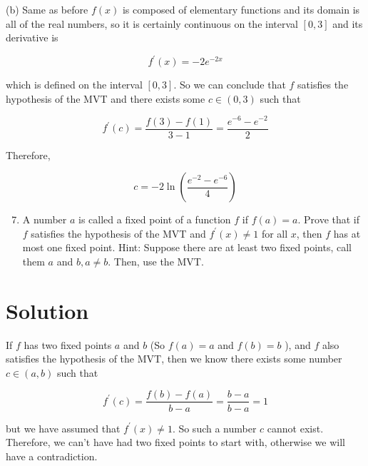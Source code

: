 \documentclass[10pt]{article}
\begin{document}
(b) Same as before $f(x)$ is composed of elementary functions and its domain is all of the real numbers, so it is certainly continuous on the interval $[0,3]$ and its derivative is

$$
f^{\prime}(x)=-2 e^{-2 x}
$$

which is defined on the interval $[0,3]$. So we can conclude that $f$ satisfies the hypothesis of the MVT and there exists some $c \in(0,3)$ such that

$$
f^{\prime}(c)=\frac{f(3)-f(1)}{3-1}=\frac{e^{-6}-e^{-2}}{2}
$$

Therefore,

$$
c=-2 \ln \left(\frac{e^{-2}-e^{-6}}{4}\right)
$$

\begin{enumerate}
  \setcounter{enumi}{6}
  \item A number $a$ is called a fixed point of a function $f$ if $f(a)=a$. Prove that if $f$ satisfies the hypothesis of the MVT and $f^{\prime}(x) \neq 1$ for all $x$, then $f$ has at most one fixed point. Hint: Suppose there are at least two fixed points, call them $a$ and $b, a \neq b$. Then, use the MVT.
\end{enumerate}

\section*{Solution}
If $f$ has two fixed points $a$ and $b$ (So $f(a)=a$ and $f(b)=b$ ), and $f$ also satisfies the hypothesis of the MVT, then we know there exists some number $c \in(a, b)$ such that

$$
f^{\prime}(c)=\frac{f(b)-f(a)}{b-a}=\frac{b-a}{b-a}=1
$$

but we have assumed that $f^{\prime}(x) \neq 1$. So such a number $c$ cannot exist. Therefore, we can't have had two fixed points to start with, otherwise we will have a contradiction.
\end{document}
